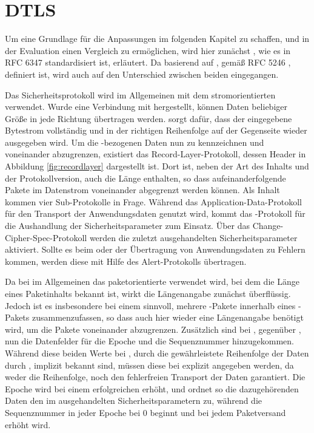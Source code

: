 \chapter{DTLS}
\label{chp:dtls}

Um eine Grundlage für die Anpassungen im folgenden Kapitel zu schaffen, und in der Evaluation einen Vergleich zu ermöglichen,
wird hier zunächst , wie es in RFC 6347 \cite{rfc6347} standardisiert ist, erläutert. Da  basierend auf
, gemäß RFC 5246 \cite{rfc5246}, definiert ist, wird auch auf den Unterschied zwischen beiden eingegangen.

Das Sicherheitsprotokoll  wird im Allgemeinen mit dem stromorientierten  verwendet.
Wurde eine Verbindung mit  hergestellt, können Daten beliebiger Größe in jede Richtung
übertragen werden.  sorgt dafür, dass der eingegebene Bytestrom vollständig und in der
richtigen Reihenfolge auf der Gegenseite wieder ausgegeben wird. Um die -bezogenen Daten nun
zu kennzeichnen und voneinander abzugrenzen, existiert das Record-Layer-Protokoll, dessen Header in Abbildung \ref{fig:recordlayer}
dargestellt ist. Dort ist, neben der Art des Inhalts und der Protokollversion, auch die Länge enthalten, so dass
aufeinanderfolgende Pakete im Datenstrom voneinander abgegrenzt werden können. Als Inhalt kommen vier Sub-Protokolle
in Frage. Während das Application-Data-Protokoll für den Transport der Anwendungsdaten genutzt wird, kommt
das -Protokoll für die Aushandlung der Sicherheitsparameter zum Einsatz. Über das Change-Cipher-Spec-Protokoll
werden die zuletzt ausgehandelten Sicherheitsparameter aktiviert. Sollte es beim  oder der Übertragung
von Anwendungsdaten zu Fehlern kommen, werden diese mit Hilfe des Alert-Protokolls übertragen.

Da bei  im Allgemeinen das paketorientierte  verwendet wird, bei dem die Länge eines
Paketinhalts bekannt ist, wirkt die Längenangabe zunächst überflüssig. Jedoch ist es insbesondere bei einem
 sinnvoll, mehrere -Pakete innerhalb eines -Pakets zusammenzufassen,
so dass auch hier wieder eine Längenangabe benötigt wird, um die Pakete voneinander abzugrenzen.
Zusätzlich sind bei , gegenüber , nun die Datenfelder für die Epoche und die Sequenznummer hinzugekommen.
Während diese beiden Werte bei , durch die gewährleistete Reihenfolge der Daten durch ,
implizit bekannt sind, müssen diese bei  explizit angegeben werden, da  weder die
Reihenfolge, noch den fehlerfreien Transport der Daten garantiert. Die Epoche wird bei einem erfolgreichen 
erhöht, und ordnet so die dazugehörenden Daten den im  ausgehandelten Sicherheitsparametern zu,
während die Sequenznummer in jeder Epoche bei $ 0 $ beginnt und bei jedem Paketversand erhöht wird.


